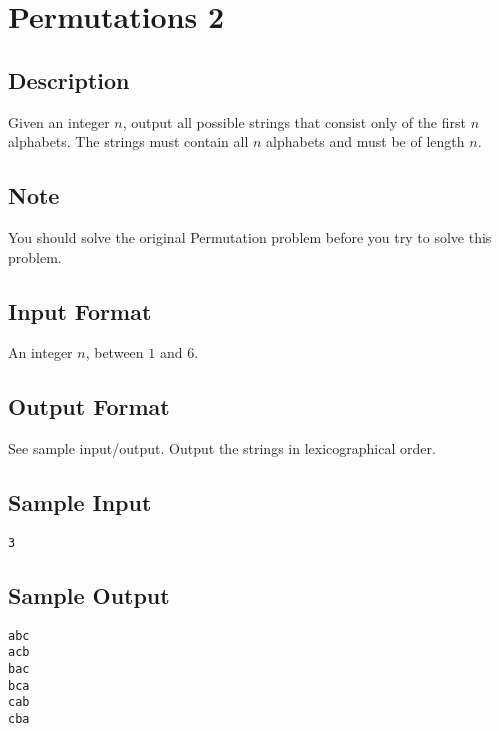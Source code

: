 

\begin{center}\end{center}
\vspace{5mm}


\section{Permutations 2}

\subsection*{Description}
Given an integer $n$, output all possible strings that consist only of the first $n$ alphabets.  The strings must contain all $n$ alphabets and must be of length $n$.


\subsection*{Note}
You should solve the original Permutation problem before you try to solve this problem.

\subsection*{Input Format}
An integer $n$, between $1$ and $6$.

\subsection*{Output Format}
See sample input/output. Output the strings in lexicographical order.

\subsection*{Sample Input}
\begin{verbatim}
3
\end{verbatim}

\subsection*{Sample Output}
\begin{verbatim}
abc
acb
bac
bca
cab
cba
\end{verbatim}


